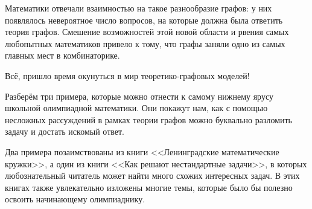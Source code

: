 	Математики отвечали взаимностью на такое разнообразие графов: у них появлялось невероятное число вопросов, на которые должна 
	была ответить теория графов. Смешение возможностей этой новой области и рвения самых любопытных математиков привело к тому, 
	что графы заняли одно из самых главных мест в комбинаторике. 

	Всё, пришло время окунуться в мир теоретико-графовых моделей!


	Разберём три примера, которые можно отнести к самому нижнему ярусу школьной олимпиадной математики. 
	Они покажут нам, как с помощью несложных рассуждений в рамках теории графов можно буквально разломить задачу и достать искомый ответ.
	
	Два примера позаимствованы из книги <<Ленинградские математические кружки>>, а один из книги <<Как решают нестандартные задачи>>, 
	в которых любознательный читатель может найти много схожих интересных задач. В этих книгах также увлекательно изложены многие темы, 
	которые было бы полезно освоить начинающему олимпиаднику.
	
